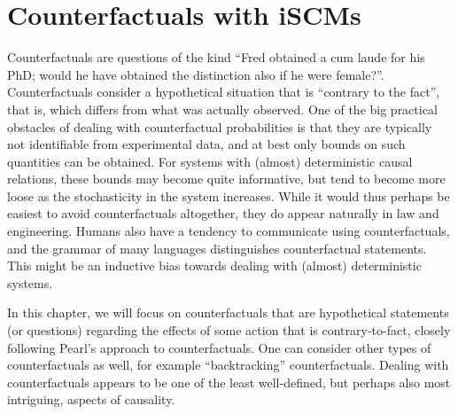\section{Counterfactuals with iSCMs}\label{sec:counterfactuals}

Counterfactuals are questions of the kind ``Fred obtained a cum laude for his PhD; would he have obtained the distinction also if he were female?''.
Counterfactuals consider a hypothetical situation that is ``contrary to the fact'', that is, which differs from what was actually observed.
One of the big practical obstacles of dealing with counterfactual probabilities is that they are typically not identifiable from experimental data, and at best only bounds on such quantities can be obtained.
For systems with (almost) deterministic causal relations, these bounds may become quite informative, but tend to become more loose as the stochasticity in the system increases.
While it would thus perhaps be easiest to avoid counterfactuals altogether, they do appear naturally in law and engineering.
Humans also have a tendency to communicate using counterfactuals, and the grammar of many languages distinguishes 
counterfactual statements. This might be an inductive bias towards dealing with (almost) deterministic systems.

In this chapter, we will focus on counterfactuals that are hypothetical
statements (or questions) regarding the effects of some action that is
contrary-to-fact, closely following Pearl's approach to counterfactuals. 
One can consider other types of counterfactuals as well, for example 
``backtracking'' counterfactuals. Dealing with counterfactuals appears to
be one of the least well-defined, but perhaps also most intriguing, aspects
of causality.

